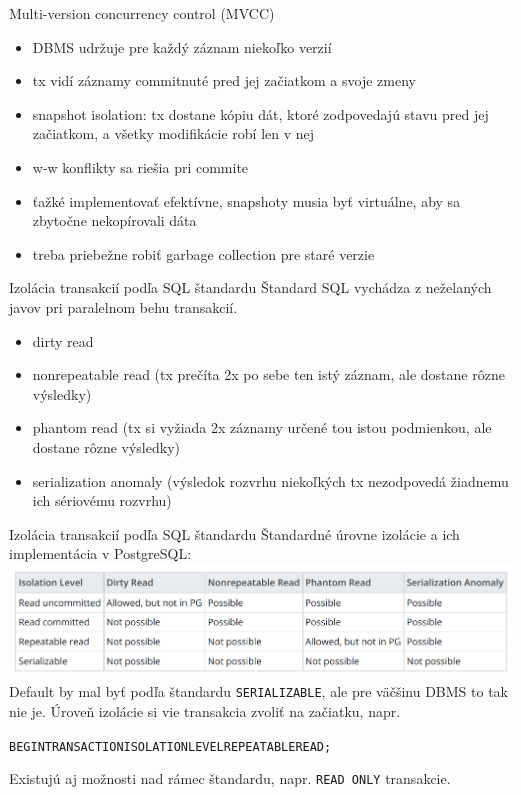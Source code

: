 \documentclass[12pt]{beamer}
\begin{document}
\begin{frame}[fragile]{Multi-version concurrency control (MVCC)}
\begin{itemize}
\item DBMS udržuje pre každý záznam niekoľko verzií
\item tx vidí záznamy commitnuté pred jej začiatkom a svoje zmeny
\item snapshot isolation: tx dostane kópiu dát, ktoré zodpovedajú stavu pred jej začiatkom, a všetky modifikácie robí len v nej
\item w-w konflikty sa riešia pri commite
\item ťažké implementovať efektívne, snapshoty musia byť virtuálne, aby sa zbytočne nekopírovali dáta
\item treba priebežne robiť garbage collection pre staré verzie
\end{itemize}
\end{frame}

\begin{frame}[fragile]{Izolácia transakcií podľa SQL štandardu}
Štandard SQL vychádza z neželaných javov pri paralelnom behu transakcií.
\begin{itemize}
\item \alert{dirty read}
\item \alert{nonrepeatable read} (tx prečíta 2x po sebe ten istý záznam, ale dostane rôzne výsledky)
\item \alert{phantom read} (tx si vyžiada 2x záznamy určené tou istou podmienkou, ale dostane rôzne výsledky)
\item \alert{serialization anomaly} (výsledok rozvrhu niekoľkých tx nezodpovedá žiadnemu ich sériovému rozvrhu)
\end{itemize}
\end{frame}

\begin{frame}[fragile]{Izolácia transakcií podľa SQL štandardu}
Štandardné úrovne izolácie a ich implementácia v PostgreSQL:
\includegraphics[scale=.2]{isolationLevels.png}\\[2mm]

Default by mal byť podľa štandardu \verb|SERIALIZABLE|, ale pre väčšinu DBMS to tak nie je.
Úroveň izolácie si vie transakcia zvoliť na začiatku, napr.
\begin{alltt}
  BEGIN TRANSACTION ISOLATION LEVEL REPEATABLE READ;
\end{alltt}

Existujú aj možnosti nad rámec štandardu, napr. \verb|READ ONLY| transakcie.
\end{frame}
\end{document}
